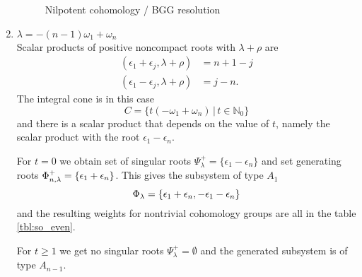\begin{enumerate}
 
\begin{figure}[H]
  \centering
{}
  \caption{Nilpotent cohomology / BGG resolution}
\end{figure}
  
 \item $ \lambda = -(n-1)\omega_1 + \omega_n$\\
  Scalar products of positive noncompact roots with $\lambda+\rho$ are
  \begin{align*}
    (\epsilon_1 + \epsilon_j, \lambda+\rho) & = n+1-j\\
    (\epsilon_1 - \epsilon_j, \lambda+\rho) & = j-n.
  \end{align*}
  The integral cone is in this case \[C = \{t(-\omega_1 + \omega_n) \,|\, t\in\mathbb{N}_0 \}\] and there is a scalar product that depends on the value of $t$, namely the scalar product with the root $\epsilon_1 - \epsilon_n.$
  
  For $t=0$ we obtain set of singular roots $\Psi^+_\lambda = \{ \epsilon_1-\epsilon_n\}$ and set generating roots $\Phi^+_{n,\lambda} = \{ \epsilon_1 + \epsilon_n \}$. This gives the subsystem of type $A_1$
  \[
   \Phi_\lambda = \{ \epsilon_1 + \epsilon_n, -\epsilon_1 - \epsilon_n\}
  \]
  and the resulting weights for nontrivial cohomology groups are all in the table \ref{tbl:so_even}. 
  
  For $t\geq 1$ we get no singular roots $\Psi^+_\lambda = \emptyset$ and the generated subsystem is of type $A_{n-1}.$


\end{enumerate}
